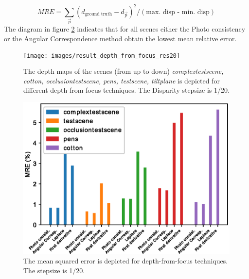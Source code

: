 \documentclass  [
  paper    = a4,
  BCOR     = 10mm,
  twoside,
  fontsize = 12pt,
  fleqn,
  toc      = bibnumbered,
  toc      = listofnumbered,
  numbers  = noendperiod,
  headings = normal,
  listof   = leveldown,
  version  = 3.03
]                                       {scrreprt}
\begin{document}
	\begin{equation}\label{key}
	MRE = \sum_{\vec p } (d_{\text{ground truth}} - d_{\vec p} )^2/(\text{max. disp - min. disp})
	\end{equation}
	The diagram in figure \ref{fig:errorres20all} indicates that for all scenes either the Photo consistency or the Angular Correspondence method obtain the lowest mean relative error.
	
	\begin{figure}
		\centering
		\texttt{[image: images/result\_depth\_from\_focus\_res20]}
		\caption[Depth from focus: depthmaps]{The depth maps of the scenes (from up to down) \textit{complextestscene, cotton, occlusiontestscene, pens, testscene, tiltplane} is depicted for different depth-from-focus techniques. The Disparity stepsize is 1/20.}
		\label{fig:resultdepthfromfocus}
	\end{figure}

	\begin{figure}
		\centering
		\includegraphics[width=0.7\linewidth]{images/error_res20_all}
		\caption[Mean squared error for depth-from-focus techniques]{The mean squared error is depicted for depth-from-focus techniques. The stepsize is 1/20.}
		\label{fig:errorres20all}
	\end{figure}
	

	
	
	
	
	
	
\end{document}
